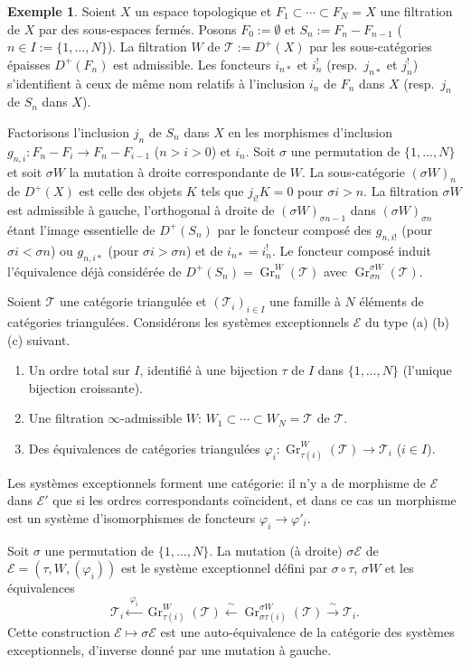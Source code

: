 \documentclass[11pt,a4paper]{article}
\theoremstyle{plain}
\theoremstyle{definition}
\newtheorem{example}[theorem]{Exemple}
\DeclareMathOperator{\Gr}{Gr}
\newcommand{\cT}{\mathscr{T}}
\newcommand{\cE}{\mathscr{E}}
\begin{document}
\begin{example}
Soient $X$ un espace topologique et $F_1 \subset \cdots \subset F_N = X$ une filtration de $X$ par des sous-espaces ferm\'es. Posons $F_0 := \emptyset$ et $S_n := F_n - F_{n-1}$ ($n \in I := \{1,\ldots,N\}$). La filtration $W$ de $\cT := D^+(X)$ par les sous-cat\'egories \'epaisses $D^+(F_n)$ est admissible. Les foncteurs $i_{n*}$ et $i_n^!$ (resp.\ $j_{n*}$ et $j_n^!$) s'identifient \`a ceux de m\^eme nom relatifs \`a l'inclusion $i_n$ de $F_n$ dans $X$ (resp.\ $j_n$ de $S_n$ dans $X$).

Factorisons l'inclusion $j_n$ de $S_n$ dans $X$ en les morphismes d'inclusion $g_{n,i} : F_n - F_i \to F_n - F_{i-1}$ ($n > i > 0$) et $i_n$. Soit $\sigma$ une permutation de $\{1,\ldots,N\}$ et soit $\sigma W$ la mutation \`a droite correspondante de $W$. La sous-cat\'egorie $(\sigma W)_n$ de $D^+(X)$ est celle des objets $K$ tels que $j_{i!} K = 0$ pour $\sigma i > n$. La filtration $\sigma W$ est admissible \`a gauche, l'orthogonal \`a droite de $(\sigma W)_{\sigma n -1}$ dans $(\sigma W)_{\sigma n}$ \'etant l'image essentielle de $D^+(S_n)$ par le foncteur compos\'e des $g_{n,i!}$ (pour $\sigma i < \sigma n$) ou $g_{n,i*}$ (pour $\sigma i > \sigma n$) et de $i_{n*} = i_n^!$. Le foncteur compos\'e induit l'\'equivalence d\'ej\`a consid\'er\'ee de $D^+(S_n) = \Gr_n^W(\cT)$ avec $\Gr_{\sigma n}^{\sigma W}(\cT)$.
\end{example}

Soient $\cT$ une cat\'egorie triangul\'ee et $(\cT_i)_{i \in I}$ une famille \`a $N$ \'el\'ements de cat\'egories triangul\'ees. Consid\'erons les syst\`emes exceptionnels $\cE$ du type (a) (b) (c) suivant.
\begin{enumerate}[label=(\alph*)]
\item Un ordre total sur $I$, identifi\'e \`a une bijection $\tau$ de $I$ dans $\{1,\ldots,N\}$ (l'unique bijection croissante).
\item Une filtration $\infty$-admissible $W$: $W_1 \subset \cdots \subset W_N = \cT$ de $\cT$.
\item Des \'equivalences de cat\'egories triangul\'ees $\varphi_i : \Gr_{\tau(i)}^W(\cT) \to \cT_i$ ($i \in I$).
\end{enumerate}
Les syst\`emes exceptionnels forment une cat\'egorie: il n'y a de morphisme de $\cE$ dans $\cE'$ que si les ordres correspondants co\"incident, et dans ce cas un morphisme est un syst\`eme d'isomorphismes de foncteurs $\varphi_i \to \varphi'_i$.

Soit $\sigma$ une permutation de $\{1,\ldots,N\}$. La mutation (\`a droite) $\sigma \cE$ de $\cE = (\tau, W, (\varphi_i))$ est le syst\`eme exceptionnel d\'efini par $\sigma \circ \tau$, $\sigma W$ et les \'equivalences
\begin{equation}\label{eq:0.2b}
\cT_i \xleftarrow{\;\varphi_i\;} \Gr_{\tau(i)}^W(\cT) \xleftarrow{\;\sim\;} \Gr_{\sigma\tau(i)}^{\sigma W}(\cT) \xrightarrow{\;\sim\;} \cT_i.
\tag{0.2}
\end{equation}
Cette construction $\cE \mapsto \sigma \cE$ est une auto-\'equivalence de la cat\'egorie des syst\`emes exceptionnels, d'inverse donn\'e par une mutation \`a gauche.
\end{document}
